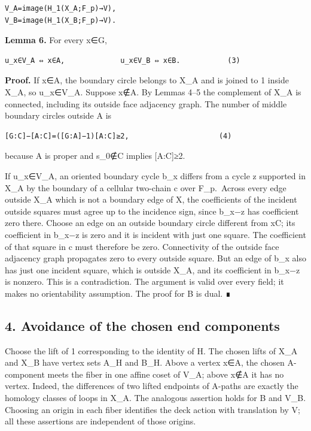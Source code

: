 \documentclass[
  11pt,
  a4paper,
]{article}
\begin{document}
\begin{verbatim}
V_A=image(H_1(X_A;F_p)→V),
V_B=image(H_1(X_B;F_p)→V).
\end{verbatim}

\textbf{Lemma 6.} For every x∈G,

\begin{verbatim}
u_x∈V_A ⇔ x∈A,             u_x∈V_B ⇔ x∈B.           (3)
\end{verbatim}

\textbf{Proof.} If x∈A, the boundary circle belongs to X\_A and is
joined to 1 inside X\_A, so u\_x∈V\_A. Suppose x∉A. By Lemmas 4--5 the
complement of X\_A is connected, including its outside face adjacency
graph. The number of middle boundary circles outside A is

\begin{verbatim}
[G:C]−[A:C]=([G:A]−1)[A:C]≥2,                     (4)
\end{verbatim}

because A is proper and s\_0∉C implies {[}A:C{]}≥2.

If u\_x∈V\_A, an oriented boundary cycle b\_x differs from a cycle z
supported in X\_A by the boundary of a cellular two-chain c over
F\_p.~Across every edge outside X\_A which is not a boundary edge of X,
the coefficients of the incident outside squares must agree up to the
incidence sign, since b\_x−z has coefficient zero there. Choose an edge
on an outside boundary circle different from xC; its coefficient in
b\_x−z is zero and it is incident with just one square. The coefficient
of that square in c must therefore be zero. Connectivity of the outside
face adjacency graph propagates zero to every outside square. But an
edge of b\_x also has just one incident square, which is outside X\_A,
and its coefficient in b\_x−z is nonzero. This is a contradiction. The
argument is valid over every field; it makes no orientability
assumption. The proof for B is dual. ∎

\subsection{4. Avoidance of the chosen end
components}\label{avoidance-of-the-chosen-end-components}

Choose the lift of 1 corresponding to the identity of H. The chosen
lifts of X\_A and X\_B have vertex sets A\_H and B\_H. Above a vertex
x∈A, the chosen A-component meets the fiber in one affine coset of V\_A;
above x∉A it has no vertex. Indeed, the differences of two lifted
endpoints of A-paths are exactly the homology classes of loops in X\_A.
The analogous assertion holds for B and V\_B. Choosing an origin in each
fiber identifies the deck action with translation by V; all these
assertions are independent of those origins.
\end{document}
